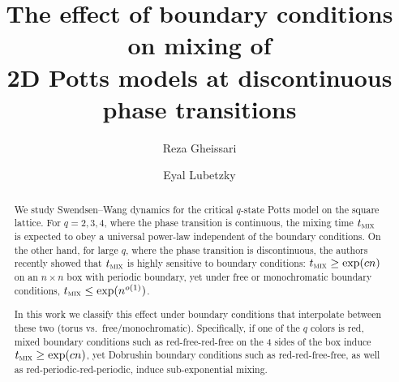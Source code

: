 \documentclass[reqno,11pt]{amsart}
\numberwithin{equation}{section}
\theoremstyle{definition}{
\newtheorem{example}[theorem]{Example}
\newtheorem{definition}[theorem]{Definition}
\newtheorem*{definition*}{Definition}
\newtheorem{problem}[theorem]{Problem}
\newtheorem{question}[theorem]{Question}
\newtheorem{remark}[theorem]{Remark}
}
\newcommand{\tmix}{t_{\textsc{mix}}}
\begin{document}
\title[Boundary conditions and mixing at discontinuous phase transitions]{The effect of boundary conditions on mixing of \\ 2D Potts models at  discontinuous phase transitions}

\author{Reza Gheissari}
\address{R.\ Gheissari\hfill\break
Courant Institute\\ New York University\\
251 Mercer Street\\ New York, NY 10012, USA.}

\author{Eyal Lubetzky}
\address{E.\ Lubetzky\hfill\break
Courant Institute\\ New York University\\
251 Mercer Street\\ New York, NY 10012, USA.}

\begin{abstract}
We study Swendsen--Wang dynamics for the critical $q$-state Potts model on the square lattice. For $q=2,3,4$, where the phase transition is continuous, the mixing time $\tmix$ is expected to obey a universal power-law independent of the boundary conditions. On the other hand, for large $q$, where the phase transition is discontinuous, the authors recently showed that $\tmix$ is highly sensitive to boundary conditions:  $\tmix \geq \exp(cn)$ on an $n\times n$ box with periodic boundary,  yet under free or monochromatic boundary conditions, $\tmix \leq\exp(n^{o(1)})$. 

In this work we classify this effect under boundary conditions that interpolate between these two (torus vs.\ free/monochromatic). 
Specifically, if one of the $q$ colors is red,
mixed boundary conditions such as red-free-red-free on the 4 sides of the box  induce $\tmix \geq \exp(cn)$, yet Dobrushin boundary conditions such as red-red-free-free, as well as red-periodic-red-periodic, induce sub-exponential mixing.
\end{abstract}

{\mbox{}
\vspace{-1.25cm}
\maketitle
}
\vspace{-0.5cm}
\end{document}
